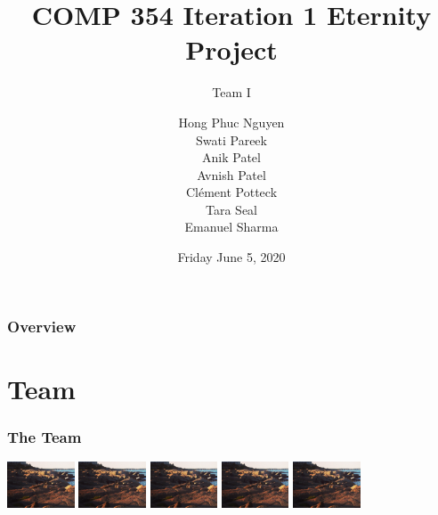 \documentclass{beamer}
\title{COMP 354 Iteration 1 Eternity Project}
\subtitle {Team I}
\author
  {
  Hong Phuc Nguyen \\ Swati Pareek \\Anik Patel\\Avnish Patel 
  \\Clément Potteck \\ Tara Seal \\Emanuel Sharma
  }
\institute{
  Concordia University
  }
\date{Friday June 5, 2020}
\begin{document}
  \frame{\titlepage}

  \begin{frame}
  \frametitle{Overview}
  \tableofcontents
  \end{frame}

  \section{Team}


  
  \begin{frame}
  \frametitle{The Team}
  \null\hfil\hfil{}
  \hfil\hfil{}
  \hfil\hfil{}
  \hfil\hfil{}
  \newline
  \hfil\includegraphics[width=2cm]{Screen Shot}
  \hfil\hfil\hfil\includegraphics[width=2cm]{Screen Shot}
  \hfil\hfil\hfil\includegraphics[width=2cm]{Screen Shot}
  \hfil\hfil\hfil\hfil\includegraphics[width=2cm]{Screen Shot}\newline
  \null\hfil\hfil{}
  \hfil\hfil{}
  \hfil\hfil{}
  \hfil\hfil{}
  \newline\newline
  \vfil
  \null\hfil\hfil{}
  \hfil\hfil{}
  \hfil\hfil{}\newline
  \hfil\hfil\includegraphics[width=2cm]{Screen Shot}

\end{frame}
\end{document}
